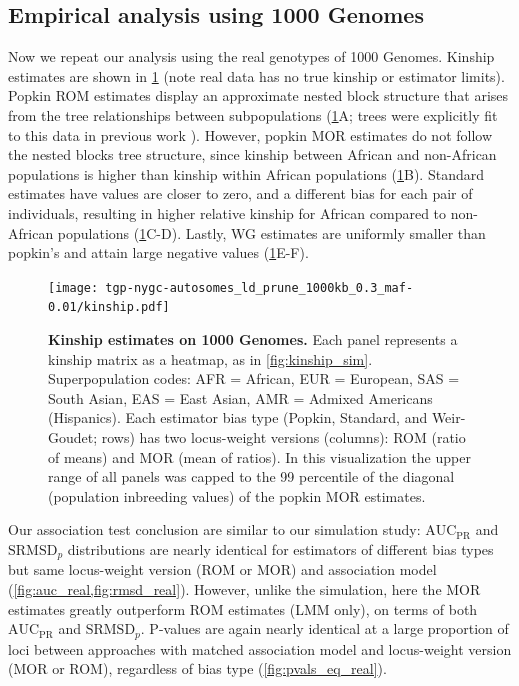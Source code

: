 \documentclass[11pt]{article}
\newcommand{\rmsd}{\text{SRMSD}_p}
\newcommand{\auc}{\text{AUC}_\text{PR}}
\begin{document}
\subsection{Empirical analysis using 1000 Genomes}

Now we repeat our analysis using the real genotypes of 1000 Genomes.
Kinship estimates are shown in \cref{fig:kinship_real} (note real data has no true kinship or estimator limits).
Popkin ROM estimates display an approximate nested block structure that arises from the tree relationships between subpopulations (\cref{fig:kinship_real}A; trees were explicitly fit to this data in previous work \citep{yao_limitations_2022}).
However, popkin MOR estimates do not follow the nested blocks tree structure, since kinship between African and non-African populations is higher than kinship within African populations (\cref{fig:kinship_real}B).
Standard estimates have values are closer to zero, and a different bias for each pair of individuals, resulting in higher relative kinship for African compared to non-African populations (\cref{fig:kinship_real}C-D).
Lastly, WG estimates are uniformly smaller than popkin's and attain large negative values (\cref{fig:kinship_real}E-F).

\begin{figure}[bp!]
  \centering
  \texttt{[image: tgp-nygc-autosomes\_ld\_prune\_1000kb\_0.3\_maf-0.01/kinship.pdf]}
  \caption{
    {\bf Kinship estimates on 1000 Genomes.}
    Each panel represents a kinship matrix as a heatmap, as in \cref{fig:kinship_sim}.
    Superpopulation codes: AFR = African, EUR = European, SAS = South Asian, EAS = East Asian, AMR = Admixed Americans (Hispanics).
    Each estimator bias type (Popkin, Standard, and Weir-Goudet; rows) has two locus-weight versions (columns): ROM (ratio of means) and MOR (mean of ratios).
    In this visualization the upper range of all panels was capped to the 99 percentile of the diagonal (population inbreeding values) of the popkin MOR estimates.
  }
  \label{fig:kinship_real}
\end{figure}

Our association test conclusion are similar to our simulation study: $\auc$ and $\rmsd$ distributions are nearly identical for estimators of different bias types but same locus-weight version (ROM or MOR) and association model (\cref{fig:auc_real,fig:rmsd_real}).
However, unlike the simulation, here the MOR estimates greatly outperform ROM estimates (LMM only), on terms of both $\auc$ and $\rmsd$.
P-values are again nearly identical at a large proportion of loci between approaches with matched association model and locus-weight version (MOR or ROM), regardless of bias type (\cref{fig:pvals_eq_real}).
\end{document}
